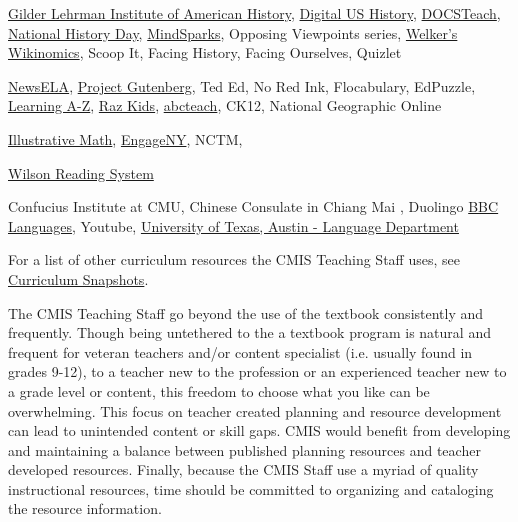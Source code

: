 \documentclass{report}
\begin{document}
\begin{findings}

\href{http://www.gilderlehrman.org/programs-exhibitions/for-students}{Gilder Lehrman Institute of American History}, \href{http://www.digitalhistory.uh.edu/}{Digital US History},  \href{https://www.docsteach.org/}{DOCSTeach}, \href{http://nhd.org/}{National History Day}, \href{http://www.mindsparks.com/c/mindsparks.web?nocache@1+s@wS_b7B8iF3AX2}{MindSparks}, Opposing Viewpoints series, \href{http://www.welkerswikinomics.com/home.html}{Welker's Wikinomics}, Scoop It, Facing History, Facing Ourselves, Quizlet 


\href{https://newsela.com/}{NewsELA}, \href{https://www.gutenberg.org/}{Project Gutenberg}, Ted Ed, No Red Ink, Flocabulary, EdPuzzle, \href{https://www.learninga-z.com/}{Learning A-Z}, \href{https://www.raz-kids.com/}{Raz Kids}, \href{http://www.abcteach.com/}{abcteach}, CK12, National Geographic Online 


\href{https://www.illustrativemathematics.org/}{Illustrative Math}, \href{https://www.engageny.org/}{EngageNY}, NCTM, 


\href{http://www.wilsonlanguage.com/programs/wilson-reading-system/}{Wilson Reading System} 


Confucius Institute at CMU, Chinese Consulate in Chiang Mai , Duolingo
\href{http://www.bbc.co.uk/languages/}{BBC Languages}, Youtube, \href{http://coerll.utexas.edu/coerll/materials}{University of Texas, Austin - Language Department} 

For a list of other curriculum resources the CMIS Teaching Staff uses, see \href{https://docs.google.com/a/cmis.ac.th/document/d/1lgeGB0P5Y9FtDV_dacRy5qcta6My6I2HbSK-ukVlxUs/edit?usp=sharing}{Curriculum Snapshots}.


The CMIS Teaching Staff go beyond the use of the textbook consistently and frequently. Though being untethered to the a textbook program is natural and frequent for veteran teachers and/or content specialist (i.e. usually found in grades 9-12), to a teacher new to the profession or an experienced teacher new to a grade level or content, this freedom to choose what you like can be overwhelming. This focus on teacher created planning and resource development can lead to unintended content or skill gaps. CMIS would benefit from developing and maintaining a balance between published planning resources and teacher developed resources. Finally, because the CMIS Staff use a myriad of quality instructional resources, time should be committed to organizing and cataloging the resource information. 
\end{findings}
\end{document}
